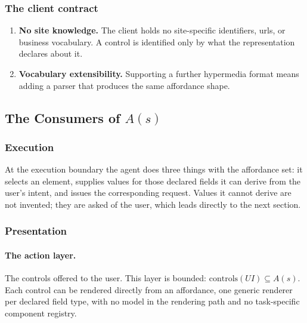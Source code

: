 
\subsubsection{The client contract}\label{sec:design:client-contract}

\begin{enumerate}
    \item[\textbf{C1}] \textbf{No site knowledge.} The client holds no site-specific identifiers, urls, or business vocabulary. A control is identified only by what the representation declares about it.
    \item[\textbf{C2}] \textbf{Vocabulary extensibility.} Supporting a further hypermedia format means adding a parser that produces the same affordance shape.
\end{enumerate}

\subsection{The Consumers of \texorpdfstring{$A(s)$}{A(s)}}\label{sec:design:consumers}

\subsubsection{Execution}\label{sec:design:consumer-agent}

At the execution boundary the agent does three things with the affordance set: it selects an element, supplies values for those declared fields it can derive from the user's intent, and issues the corresponding request. Values it cannot derive are not invented; they are asked of the user, which leads directly to the next section.

\subsubsection{Presentation}\label{sec:design:consumer-ui}

\paragraph{The action layer.} The controls offered to the user. This layer is bounded: $\mathrm{controls}(UI) \subseteq A(s)$. Each control can be rendered directly from an affordance, one generic renderer per declared field type, with no model in the rendering path and no task-specific component registry. 

